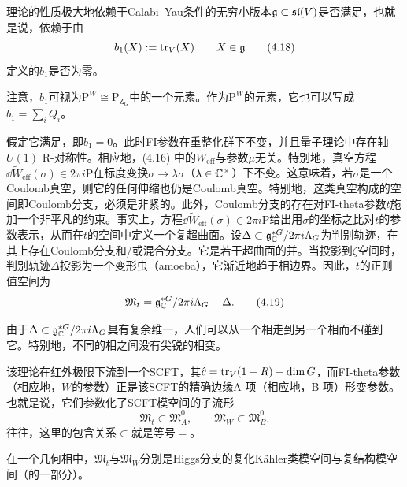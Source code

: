 理论的性质极大地依赖于Calabi–Yau条件的无穷小版本$\mathfrak{g}\subset\mathfrak{sl}(V)$是否满足，也就是说，依赖于由
\begin{equation}
b_1(X):=\operatorname{tr}_V(X)\qquad X\in\mathfrak{g}
\tag{4.18}
\end{equation}
定义的$b_1$是否为零。

注意，$b_1$可视为$\mathrm{P}^W\cong\mathrm{P}_{\mathrm{Z}_G}$中的一个元素。作为$\mathrm{P}^W$的元素，它也可以写成$b_1=\sum_iQ_i$。



假定它满足，即$b_1=0$。此时FI参数在重整化群下不变，并且量子理论中存在轴$U(1)$ R-对称性。相应地，(4.16) 中的$\widetilde{W}_{\text{eff}}$与参数$\mu$无关。特别地，真空方程$\dd\widetilde{W}_{\text{eff}}(\sigma)\in2\pi i\mathrm{P}$在标度变换$\sigma\to\lambda\sigma$（$\lambda\in\mathbb{C}^\times$）下不变。这意味着，若$\sigma$是一个Coulomb真空，则它的任何伸缩也仍是Coulomb真空。特别地，这类真空构成的空间即Coulomb分支，必须是非紧的。此外，Coulomb分支的存在对FI-theta参数$t$施加一个非平凡的约束。事实上，方程$\dd\widetilde{W}_{\text{eff}}(\sigma)\in2\pi i\mathrm{P}$给出用$\sigma$的坐标之比对$t$的参数表示，从而在$t$的空间中定义一个复超曲面。设$\Delta\subset\mathfrak{g}^{*G}_{\mathbb{C}}/2\pi i\Lambda_G$为判别轨迹，在其上存在Coulomb分支和/或混合分支。它是若干超曲面的并。当投影到$\zeta$空间时，判别轨迹$\Delta$投影为一个变形虫（amoeba），它渐近地趋于相边界。因此，$t$的正则值空间为
\begin{equation}
\mathfrak{M}_t=\mathfrak{g}^{*G}_{\mathbb{C}}/2\pi i\Lambda_G-\Delta.
\tag{4.19}
\end{equation}

由于$\Delta\subset\mathfrak{g}^{*G}_{\mathbb{C}}/2\pi i\Lambda_G$具有复余维一，人们可以从一个相走到另一个相而不碰到它。特别地，不同的相之间没有尖锐的相变。

该理论在红外极限下流到一个SCFT，其$\hat c=\operatorname{tr}_V(1-R)-\dim G$，而FI-theta参数（相应地，$W$的参数）正是该SCFT的精确边缘A-项（相应地，B-项）形变参数。也就是说，它们参数化了SCFT模空间的子流形
\begin{equation}
\mathfrak{M}_t\subset\mathfrak{M}^0_A,\qquad\mathfrak{M}_W\subset\mathfrak{M}^0_B.
\tag{4.20}
\end{equation}
往往，这里的包含关系$\subset$就是等号$=$。

在一个几何相中，$\mathfrak{M}_t$与$\mathfrak{M}_W$分别是Higgs分支的复化Kähler类模空间与复结构模空间（的一部分）。

